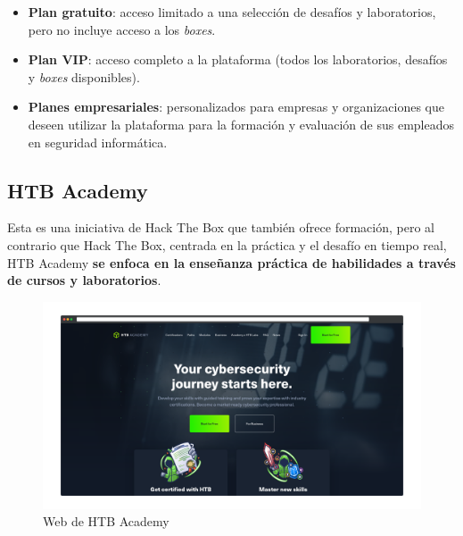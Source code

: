         \begin{itemize}
            \item \textbf{Plan gratuito}: acceso limitado a una selección de desafíos y laboratorios, pero no incluye acceso a los \textit{boxes}.
        
            \item \textbf{Plan VIP}: acceso completo a la plataforma (todos los laboratorios, desafíos y \textit{boxes} disponibles).
        
            \item \textbf{Planes empresariales}: personalizados para empresas y organizaciones que deseen utilizar la plataforma para la formación y evaluación de sus empleados en seguridad informática.
        \end{itemize}
        
        \newpage

    
    \subsection{HTB Academy}
    
        Esta es una iniciativa de Hack The Box que también ofrece formación, pero al contrario que Hack The Box, centrada en la práctica y el desafío en tiempo real, HTB Academy \textbf{se enfoca en la enseñanza práctica de habilidades a través de cursos y laboratorios}.
        
        \begin{figure}[h]
            \centering

            \includegraphics[width=\textwidth]{images/Capturas/Web de HTB Academy.png}
            
            \caption{Web de HTB Academy}
            \label{fig:HTB-Academy-web}
        \end{figure}
        

